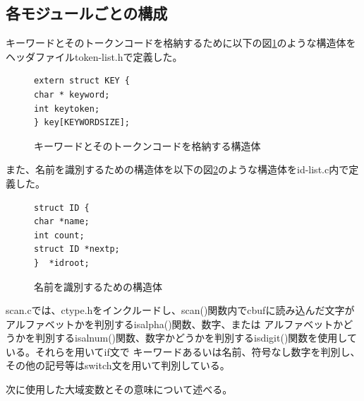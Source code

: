 \documentclass{jarticle}
\begin{document}
\subsection{各モジュールごとの構成}
キーワードとそのトークンコードを格納するために以下の図\ref{struct-key}のような構造体をヘッダファイルtoken-list.hで定義した。
\begin{figure}[H]
\begin{center}
\begin{lstlisting}
extern struct KEY {
char * keyword;
int keytoken;
} key[KEYWORDSIZE];
\end{lstlisting}
\caption{キーワードとそのトークンコードを格納する構造体}
\label{struct-key}
\end{center}
\end{figure}
また、名前を識別するための構造体を以下の図\ref{struct-id}のような構造体をid-list.c内で定義した。
\begin{figure}[H]
\begin{center}
\begin{lstlisting}
struct ID {
char *name;
int count;
struct ID *nextp;
}  *idroot;
\end{lstlisting}
\caption{名前を識別するための構造体}
\label{struct-id}
\end{center}
\end{figure}

scan.cでは、ctype.hをインクルードし、scan()関数内でcbufに読み込んだ文字がアルファベットかを判別するisalpha()関数、数字、または
アルファベットかどうかを判別するisalnum()関数、数字かどうかを判別するisdigit()関数を使用している。それらを用いてif文で
キーワードあるいは名前、符号なし数字を判別し、その他の記号等はswitch文を用いて判別している。

次に使用した大域変数とその意味について述べる。
\end{document}
